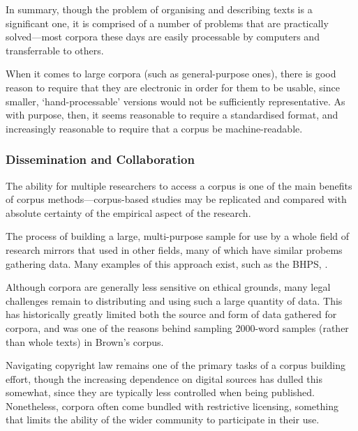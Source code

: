 

In summary, though the problem of organising and describing texts is a significant one, it is comprised of a number of problems that are practically solved---most corpora these days are easily processable by computers and transferrable to others.

When it comes to large corpora (such as general-purpose ones), there is good reason to require that they are electronic in order for them to be usable, since smaller, `hand-processable' versions would not be sufficiently representative.  As with purpose, then, it seems reasonable to require a standardised format, and increasingly reasonable to require that a corpus be machine-readable.







\subsubsection{Dissemination and Collaboration}
The ability for multiple researchers to access a corpus is one of the main benefits of corpus methods---corpus-based studies may be replicated and compared with absolute certainty of the empirical aspect of the research.  

The process of building a large, multi-purpose sample for use by a whole field of research mirrors that used in other fields, many of which have similar probems gathering data.  Many examples of this approach exist, such as the BHPS, .

Although corpora are generally less sensitive on ethical grounds, many legal challenges remain to distributing and using such a large quantity of data.  This has historically greatly limited both the source and form of data gathered for corpora, and was one of the reasons behind sampling 2000-word samples (rather than whole texts) in Brown's corpus.

Navigating copyright law remains one of the primary tasks of a corpus building effort, though the increasing dependence on digital sources has dulled this somewhat, since they are typically less controlled when being published.  Nonetheless, corpora often come bundled with restrictive licensing, something that limits the ability of the wider community to participate in their use.

